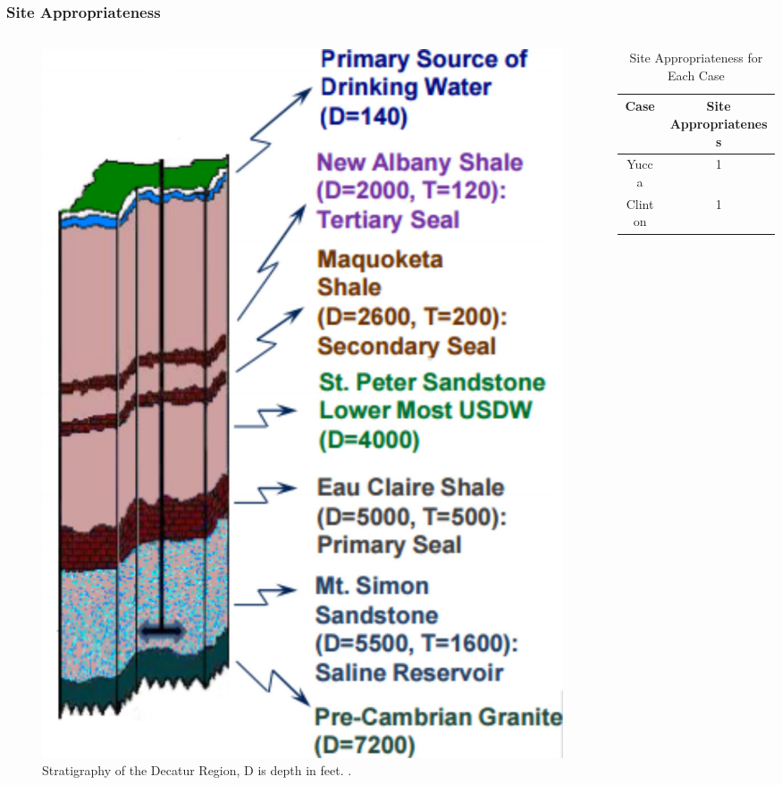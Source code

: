 \begin{frame}
	\frametitle{Site Appropriateness}
	\begin{columns}
		\begin{column}{.49\columnwidth}
			\begin{figure}[h]
				\includegraphics[width=0.75\columnwidth]{./images/Stratigraphy-Decatur.jpg}	
				\caption{Stratigraphy of the Decatur Region, D is depth in feet. \cite{mcdonald_illinois_2012}.}
				\label{fig:Stratigraphy}
			\end{figure}
		\end{column}
	\begin{column}{.49\columnwidth}
	\begin{table}[h]
		\caption {Site Appropriateness for Each Case}
		\begin{tabular}{|c|c|}
			\hline
			Case & Site Appropriateness \\
			\hline
			Yucca & 1 \\
			Clinton & 1 \\
			\hline
		\end{tabular}
	\end{table}
	\end{column}
	\end{columns}
\end{frame}


